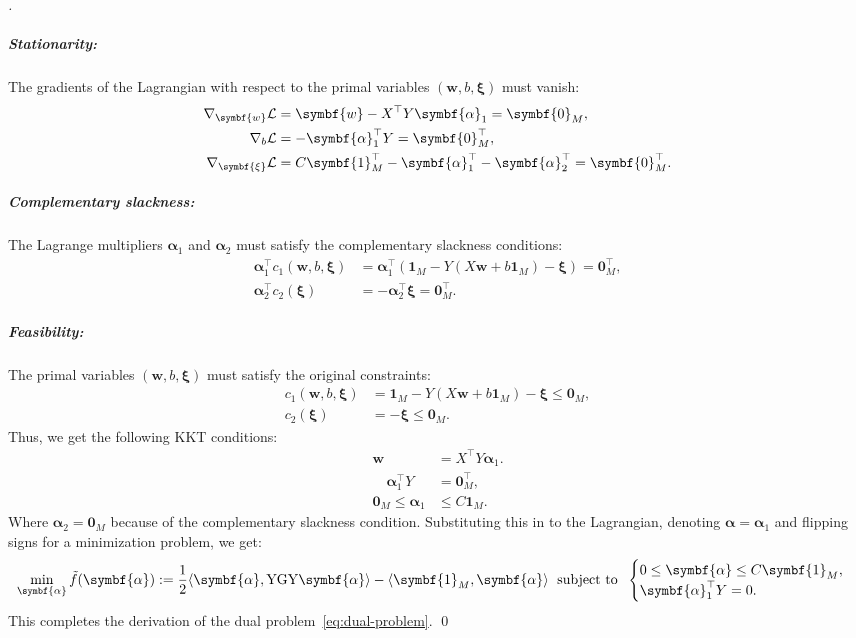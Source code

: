 \begin{proof}[]
	\vspace{-0.7cm}
	\subparagraph{Stationarity:} The gradients of the Lagrangian with respect to the primal variables $(\symbf{w}, b, \symbf{\xi})$ must vanish:
	\begin{align*}
		\nabla_{\symbf{w}} \Lcal &= \symbf{w} -  X^\top Y \symbf{\alpha}_1 = \symbf{0}_M,\\
		\nabla_{b} \Lcal &= - \symbf{\alpha}_1^\top Y = \symbf{0}_M^\top,\\
		\nabla_{\symbf{\xi}} \Lcal  &= C \symbf{1}_M^\top - \symbf{\alpha}_1^\top - \symbf{\alpha}_2^\top = \symbf{0}_M^\top.
	\end{align*}
	\subparagraph{Complementary slackness:} The Lagrange multipliers $\symbf{\alpha}_1$ and $\symbf{\alpha}_2$ must satisfy the complementary slackness conditions:
	\begin{align*}
		\symbf{\alpha}_1^\top c_1(\symbf{w},b,\symbf{\xi}) &= \symbf{\alpha}_1^\top \left(\symbf{1}_M - Y\left(X\symbf{w} + b\symbf{1}_M\right)-\symbf{\xi}\right) = \symbf{0}_M^\top, \\
		\symbf{\alpha}_2^\top c_2(\symbf{\xi}) &= -\symbf{\alpha}_2^\top \symbf{\xi}= \symbf{0}_M^\top.
	\end{align*}

	\subparagraph{Feasibility:} The primal variables $(\symbf{w}, b, \symbf{\xi})$ must satisfy the original constraints:
	\begin{align*}
		c_1(\symbf{w},b,\symbf{\xi}) &= \symbf{1}_M - Y\left(X\symbf{w} + b\symbf{1}_M\right)-\symbf{\xi} \le \symbf{0}_M,\\
		c_2(\symbf{\xi}) &= -\symbf{\xi} \le \symbf{0}_M.
	\end{align*}
	Thus, we get the following KKT conditions:
	\begin{align*}
		\symbf{w}             & = X^\top Y \symbf{\alpha}_1.\\
		\quad \symbf{\alpha}_1^\top Y  &= \symbf{0}_M^\top,\\
		\symbf{0}_M \leq \symbf{\alpha}_1 &\leq C\symbf{1}_M.
	\end{align*}
	Where $\symbf{\alpha}_2 = \symbf{0}_M$ because of the complementary slackness condition.
	Substituting this in to the Lagrangian, denoting $\symbf{\alpha} = \symbf{\alpha}_1$ and flipping signs for a minimization problem, we get:
	\begin{align*}
		\min_{\symbf{\alpha}} \tilde{f}(\symbf{\alpha}) := \frac{1}{2} \inner*{\symbf{\alpha}, \mathrm{Y} \mathrm{G} \mathrm{Y} \symbf{\alpha}} -  \inner*{\symbf{1}_M, \symbf{\alpha}}
		\;
		\text{ subject to }
		\;
		\begin{cases}
			0 \leq \symbf{\alpha} \leq C\symbf{1}_M,\\
			\symbf{\alpha}_1^\top Y = 0.
		\end{cases}
	\end{align*}
	This completes the derivation of the dual problem~\eqref{eq:dual-problem}. \qed
\end{proof}
